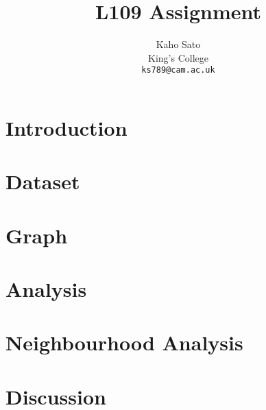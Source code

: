 \documentclass[11pt]{article}
\title{L109 Assignment}
\author{Kaho Sato \\
King's College \\
  {\tt ks789@cam.ac.uk}}
\date{}
\begin{document}
\maketitle

\section{Introduction}
\label{sec:introduction}


\section{Dataset}
\label{sec:dataset}


\section{Graph}
\label{sec:graph}


\section{Analysis}
\label{sec:analysis}


\section{Neighbourhood Analysis}
\label{sec:community}


\section{Discussion}
\label{sec:discussion}



\nocite{*}

\end{document}
